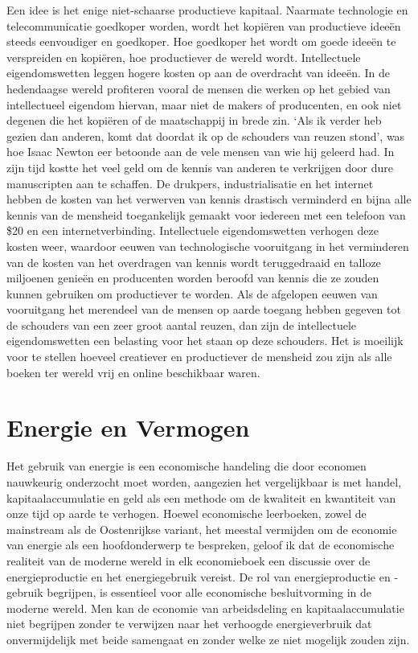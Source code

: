 \documentclass[
  a5paper,
  smalldemyvopaper,11pt,twoside,onecolumn,openright,extrafontsizes,
hidelinks]{memoir}
\begin{document}
Een idee is het enige niet-schaarse productieve kapitaal. Naarmate
technologie en telecommunicatie goedkoper worden, wordt het kopiëren van
productieve ideeën steeds eenvoudiger en goedkoper. Hoe goedkoper het
wordt om goede ideeën te verspreiden en kopiëren, hoe productiever de
wereld wordt. Intellectuele eigendomswetten leggen hogere kosten op aan
de overdracht van ideeën. In de hedendaagse wereld profiteren vooral de
mensen die werken op het gebied van intellectueel eigendom hiervan, maar
niet de makers of producenten, en ook niet degenen die het kopiëren of
de maatschappij in brede zin. `Als ik verder heb gezien dan anderen,
komt dat doordat ik op de schouders van reuzen stond', was hoe Isaac
Newton eer betoonde aan de vele mensen van wie hij geleerd had. In zijn
tijd kostte het veel geld om de kennis van anderen te verkrijgen door
dure manuscripten aan te schaffen. De drukpers, industrialisatie en het
internet hebben de kosten van het verwerven van kennis drastisch
verminderd en bijna alle kennis van de mensheid toegankelijk gemaakt
voor iedereen met een telefoon van \$20 en een internetverbinding.
Intellectuele eigendomswetten verhogen deze kosten weer, waardoor eeuwen
van technologische vooruitgang in het verminderen van de kosten van het
overdragen van kennis wordt teruggedraaid en talloze miljoenen genieën
en producenten worden beroofd van kennis die ze zouden kunnen gebruiken
om productiever te worden. Als de afgelopen eeuwen van vooruitgang het
merendeel van de mensen op aarde toegang hebben gegeven tot de schouders
van een zeer groot aantal reuzen, dan zijn de intellectuele
eigendomswetten een belasting voor het staan op deze schouders. Het is
moeilijk voor te stellen hoeveel creatiever en productiever de mensheid
zou zijn als alle boeken ter wereld vrij en online beschikbaar waren.

\chapter{Energie en Vermogen}\label{sec-energie-en-vermogen}

Het gebruik van energie is een economische handeling die door economen
nauwkeurig onderzocht moet worden, aangezien het vergelijkbaar is met
handel, kapitaalaccumulatie en geld als een methode om de kwaliteit en
kwantiteit van onze tijd op aarde te verhogen. Hoewel economische
leerboeken, zowel de mainstream als de Oostenrijkse variant, het meestal
vermijden om de economie van energie als een hoofdonderwerp te
bespreken, geloof ik dat de economische realiteit van de moderne wereld
in elk economieboek een discussie over de energieproductie en het
energiegebruik vereist. De rol van energieproductie en -gebruik
begrijpen, is essentieel voor alle economische besluitvorming in de
moderne wereld. Men kan de economie van arbeidsdeling en
kapitaalaccumulatie niet begrijpen zonder te verwijzen naar het
verhoogde energieverbruik dat onvermijdelijk met beide samengaat en
zonder welke ze niet mogelijk zouden zijn.
\end{document}
